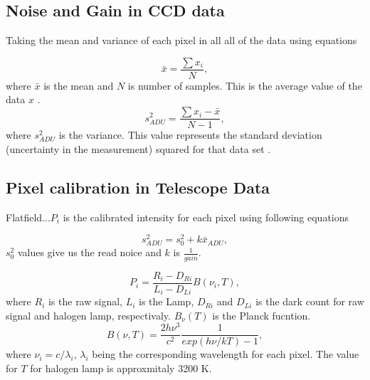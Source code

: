 \documentclass[a4paper,12pt]{article}
\begin{document}
\subsection{Noise and Gain in CCD data} 
\label{sec:noise_ccd}

Taking the mean and variance of each pixel in all all of the data using equations

\begin{equation}
\label{eq:mean}
\bar{x} = \frac{\sum x_i}{N},
\end{equation}
where $\bar{x}$ is the mean and $N$ is number of samples. This is the average value of the data $x$ \cite{error}.
\begin{equation}
\label{eq:variance}
s^2_{ADU} = \frac{\sum x_i - \bar{x}}{N-1},
\end{equation}
where $s^2_{ADU}$ is the variance. This value represents the standard deviation (uncertainty in the measurement) squared for that data set \cite{error}. 

\subsection{Pixel calibration in Telescope Data} 
\label{sec:noise_tele}

Flatfield...$P_i$ is the calibrated intensity for each pixel using following equations \cite{instructions} 

\begin{equation}
\label{gain}
s^2_{ADU} = s^2_0 + k\bar{x}_{ADU},
\end{equation}
$s^2_0$ values give us the read noice and $k$ is $\frac{1}{gain}$. 

\begin{equation}
\label{blackb}
P_i = {\frac{R_i-D_{Ri}}{L_i-D_{Li}}B(\nu_i,T)},
\end{equation}
where $R_i$ is the raw signal, $L_i$ is the Lamp, $D_{Ri}$ and $D_{Li}$ is the dark count for raw signal and halogen lamp, respectivaly. $B_{\nu}(T)$ is the Planck fucntion.  
\begin{equation}
\label{planck}
B(\nu,T) = {\frac{2h\nu^3}{c^2}\frac{1}{exp(h\nu/kT)-1}},
\end{equation}
where $\nu_i=c/\lambda_i$, $\lambda_i$ being the corresponding wavelength for each pixel. The value for $T$ for halogen lamp is approxmitaly 3200 K.
\end{document}
